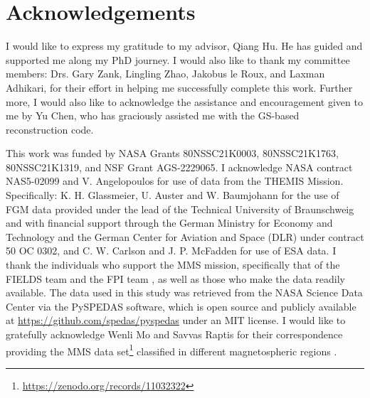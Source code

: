 \chapter{Acknowledgements}
\doublespacing


I would like to express my gratitude to my advisor, Qiang Hu. He has guided and supported me along my PhD journey. I would also like to thank my committee members: Drs. Gary Zank, Lingling Zhao, Jakobus le Roux, and Laxman Adhikari, for their effort in helping me successfully complete this work. Further more, I would also like to acknowledge the assistance and encouragement given to me by Yu Chen, who has graciously assisted me with the GS-based reconstruction code.

This work was funded by NASA Grants 80NSSC21K0003, 80NSSC21K1763, 80NSSC21K1319, and NSF Grant AGS‐2229065. I acknowledge NASA contract NAS5-02099 and V. Angelopoulos for use of data from the THEMIS Mission. Specifically: K. H. Glassmeier, U. Auster and W. Baumjohann for the use of FGM data \citep{Auster:2008} provided under the lead of the Technical University of Braunschweig and with financial support through the German Ministry for Economy and Technology and the German Center for Aviation and Space (DLR) under contract 50 OC 0302, and C. W. Carlson and J. P. McFadden for use of ESA \citep{McFadden:2008} data. I thank the individuals who support the MMS mission, specifically that of the FIELDS team \citep{Torbert:2016} and the FPI team \citep{Pollock:2016}, as well as those who make the data readily available. The data used in this study was retrieved from the NASA Science Data Center via the PySPEDAS software, which is open source and publicly available at \url{https://github.com/spedas/pyspedas} under an MIT license. I would like to gratefully acknowledge Wenli Mo and Savvas Raptis for their correspondence providing the MMS data set\footnote{\url{https://zenodo.org/records/11032322}} classified in different magnetospheric regions \cite{ToyEdens:2024}.



